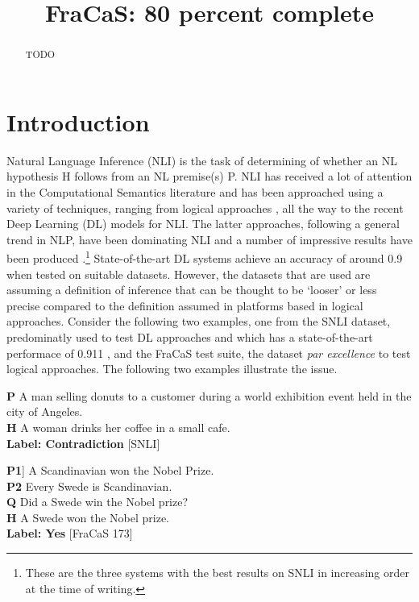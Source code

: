 \documentclass[11pt]{article}
\title{FraCaS: 80 percent complete}
\begin{document}
\maketitle{}

\begin{abstract}
  TODO
\end{abstract}
\section{Introduction}
Natural Language Inference (NLI) is the task of determining of whether
an NL hypothesis H follows from an NL premise(s) P. NLI has received a
lot of attention in the Computational Semantics literature and has
been approached using a variety of techniques, ranging from logical
approaches
\citep{bos:2008,Mineshima:2015,Abzianidze:2015,bernardy_type_2017},
all the way to the recent Deep Learning (DL) models for NLI. The
latter approaches, following a general trend in NLP, have been
dominating NLI and a number of impressive results have been
produced \citep{kim:2018,radford:2018,liu:2019}.\footnote{These are
  the three systems with the best results on SNLI in increasing
  order at the time of writing.}  State-of-the-art DL systems achieve an accuracy of around
0.9 when tested on suitable datasets. However, the datasets that are
used are assuming a definition of inference that can be thought to be
`looser' or less precise compared to the definition assumed in
platforms based in logical approaches. Consider the following
two examples, one from the SNLI dataset, predominatly used to test DL
approaches and which has a state-of-the-art performace of 0.911
\citet{liu:2019}, and the FraCaS test suite, the dataset \textit{par
  excellence} to test logical approaches.
%
The following two examples illustrate the issue.
\begin{lingex}
\item %
\textbf{P}  A  man selling donuts to a customer during a world
exhibition event held in the city of Angeles. \\
 \textbf{H}  A woman drinks her coffee in a small cafe.\\
\textbf{Label: Contradiction} [SNLI]
\item %
\textbf{P1}] A Scandinavian won the Nobel Prize.\\
\textbf{P2}	Every Swede is  Scandinavian.\\
\textbf{Q}  Did a Swede win the Nobel prize? \\
\textbf{H} A Swede won the Nobel prize.\\
\textbf{Label: Yes} [FraCaS 173]
\end{lingex}
\end{document}
